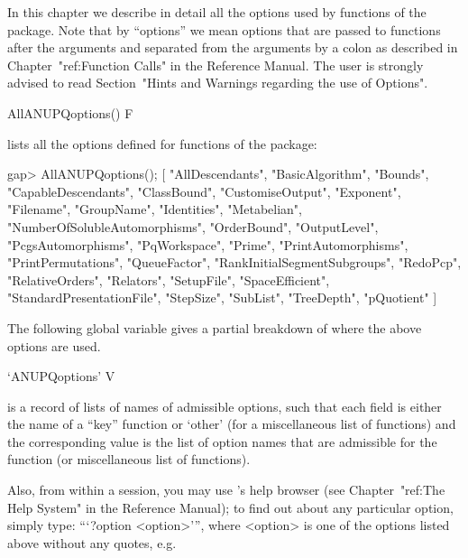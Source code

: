 

In this chapter we describe in detail all the options used  by  functions
of the {\ANUPQ} package. Note that by ``options'' we mean {\GAP}  options
that are passed to functions after the arguments and separated  from  the
arguments by a colon as described in Chapter~"ref:Function Calls" in  the
Reference Manual. The user is strongly advised to read Section~"Hints and
Warnings regarding the use of Options".

\>AllANUPQoptions() F

lists all the {\GAP}  options  defined  for  functions  of  the  {\ANUPQ}
package:

\beginexample
gap> AllANUPQoptions();
[ "AllDescendants", "BasicAlgorithm", "Bounds", "CapableDescendants", 
  "ClassBound", "CustomiseOutput", "Exponent", "Filename", "GroupName", 
  "Identities", "Metabelian", "NumberOfSolubleAutomorphisms", "OrderBound", 
  "OutputLevel", "PcgsAutomorphisms", "PqWorkspace", "Prime", 
  "PrintAutomorphisms", "PrintPermutations", "QueueFactor", 
  "RankInitialSegmentSubgroups", "RedoPcp", "RelativeOrders", "Relators", 
  "SetupFile", "SpaceEfficient", "StandardPresentationFile", "StepSize", 
  "SubList", "TreeDepth", "pQuotient" ]
\endexample

The following global variable gives a  partial  breakdown  of  where  the
above options are used.

\>`ANUPQoptions' V

is a record of lists of names of admissible {\ANUPQ} options, such  that
each field is either the name of a ``key'' {\ANUPQ} function  or  `other'
(for a miscellaneous list of functions) and the  corresponding  value  is
the list of option  names  that  are  admissible  for  the  function  (or
miscellaneous list of functions).

Also, from within a {\GAP} session, you may  use  {\GAP}'s  help  browser
(see Chapter~"ref:The Help System" in the {\GAP}  Reference  Manual);  to
find out about any particular {\ANUPQ} option,  simply  type:  ```?option
<option>''', where <option> is one of the options  listed  above  without
any quotes, e.g.

